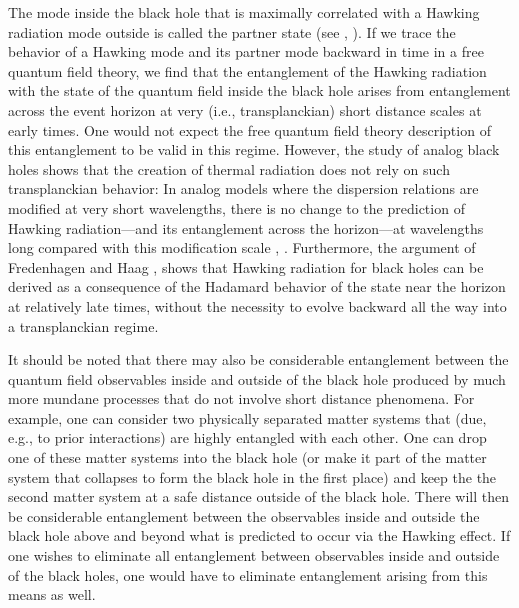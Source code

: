 \documentclass[12pt,nofootinbib,amsmath,amssymb,amsfonts,aps,prd,groupedaddress]{revtex4-1}
\begin{document}
The mode inside the black hole that is
maximally correlated with a Hawking radiation mode outside is called the partner state (see \cite{wald1}, \cite{hsu}). If we trace the behavior of a Hawking mode and its partner mode backward in time in a free quantum field theory, we find that the entanglement of the Hawking radiation
with the state of the quantum field inside the black hole arises from entanglement across the event horizon at very (i.e., transplanckian) short distance
scales at early times. One would not expect the free quantum field theory description of this entanglement to be valid in this regime. However, the study of analog black holes shows that 
the creation of thermal radiation does not rely on such transplanckian behavior: In analog models where the dispersion relations are modified at very short wavelengths, there is no change to
the prediction of Hawking radiation---and
its entanglement across the horizon---at wavelengths long compared with this modification scale
\cite{unr95}, \cite{cj}.
Furthermore, the argument of Fredenhagen and Haag \cite{fh}, \cite{hw} shows that Hawking radiation for black holes
can be derived as a consequence of the Hadamard behavior of the state near the horizon at relatively late times, without the necessity to evolve backward all the way into a transplanckian regime.

It should be noted that there may also be considerable
entanglement between the quantum field observables inside and outside of the
black hole produced by much more mundane processes that do not involve short
distance phenomena. For example, one can consider two physically separated
matter systems that (due, e.g., to prior interactions) are highly entangled with
each other. One can drop one of these matter systems into the black hole (or
make it part of the matter system that collapses to form the black hole in the
first place) and keep the the second matter system at a safe distance outside of the black
hole. There will then be considerable entanglement between the observables
inside and outside the black hole above and beyond what is predicted to occur
via the Hawking effect. If one wishes to eliminate all entanglement between observables inside
and outside of the black holes, one would have to eliminate entanglement arising from this
means as well.
\end{document}

